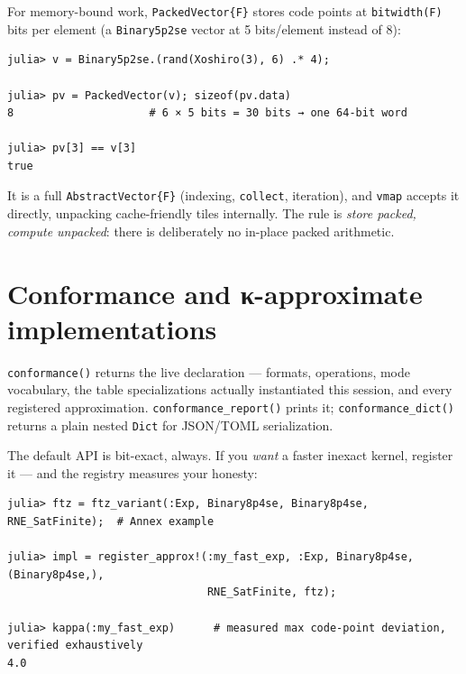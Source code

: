 \label{8567984038512272605}{}


For memory-bound work, \texttt{PackedVector\{F\}} stores code points at \texttt{bitwidth(F)} bits per element (a \texttt{Binary5p2se} vector at 5 bits/element instead of 8):




\begin{verbatim}
julia> v = Binary5p2se.(rand(Xoshiro(3), 6) .* 4);

julia> pv = PackedVector(v); sizeof(pv.data)
8                     # 6 × 5 bits = 30 bits → one 64-bit word

julia> pv[3] == v[3]
true
\end{verbatim}



It is a full \texttt{AbstractVector\{F\}} (indexing, \texttt{collect}, iteration), and \texttt{vmap} accepts it directly, unpacking cache-friendly tiles internally. The rule is \emph{store packed, compute unpacked}: there is deliberately no in-place packed arithmetic.



\section{Conformance and κ-approximate implementations}



\label{16045636492794422690}{}


\texttt{conformance()} returns the live declaration — formats, operations, mode vocabulary, the table specializations actually instantiated this session, and every registered approximation. \texttt{conformance\_report()} prints it; \texttt{conformance\_dict()} returns a plain nested \texttt{Dict} for JSON/TOML serialization.



The default API is bit-exact, always. If you \emph{want} a faster inexact kernel, register it — and the registry measures your honesty:




\begin{verbatim}
julia> ftz = ftz_variant(:Exp, Binary8p4se, Binary8p4se, RNE_SatFinite);  # Annex example

julia> impl = register_approx!(:my_fast_exp, :Exp, Binary8p4se, (Binary8p4se,),
                               RNE_SatFinite, ftz);

julia> kappa(:my_fast_exp)      # measured max code-point deviation, verified exhaustively
4.0
\end{verbatim}



